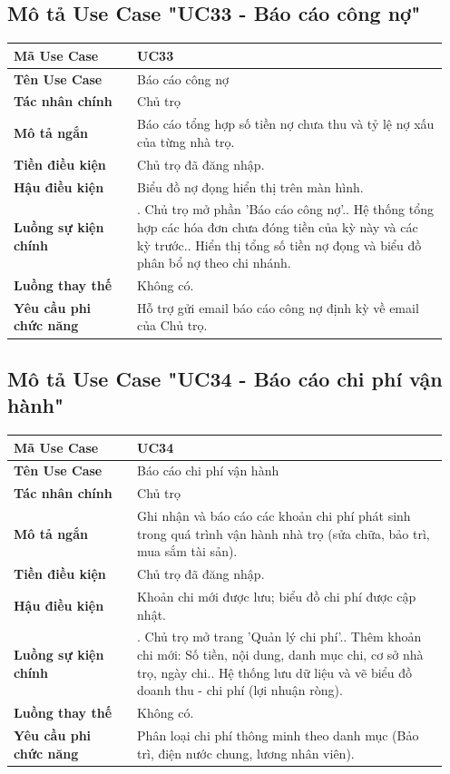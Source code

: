 \documentclass[a4paper,oneside]{report}
\begin{document}
\subsection{Mô tả Use Case "UC33 - Báo cáo công nợ"}

\begin{longtable}[]{@{}>{\RaggedRight\arraybackslash}p{0.27\linewidth}>{\RaggedRight\arraybackslash}p{0.68\linewidth}@{}}
\toprule
\textbf{Mã Use Case} & UC33\tabularnewline
\midrule
\endhead
\textbf{Tên Use Case} & Báo cáo công nợ\tabularnewline
\textbf{Tác nhân chính} & Chủ trọ\tabularnewline
\textbf{Mô tả ngắn} & Báo cáo tổng hợp số tiền nợ chưa thu và tỷ lệ nợ
xấu của từng nhà trọ.\tabularnewline
\textbf{Tiền điều kiện} & Chủ trọ đã đăng nhập.\tabularnewline
\textbf{Hậu điều kiện} & Biểu đồ nợ đọng hiển thị trên màn
hình.\tabularnewline
\textbf{Luồng sự kiện chính} & 1. Chủ trọ mở phần
'Báo cáo công nợ'.\newline 2. Hệ thống tổng hợp các hóa đơn chưa
đóng tiền của kỳ này và các kỳ trước.\newline 3. Hiển thị tổng số
tiền nợ đọng và biểu đồ phân bổ nợ theo chi nhánh.\tabularnewline
\textbf{Luồng thay thế} & Không có.\tabularnewline
\textbf{Yêu cầu phi chức năng} & Hỗ trợ gửi email báo cáo công nợ định
kỳ về email của Chủ trọ.\tabularnewline
\bottomrule
\end{longtable}

\subsection{Mô tả Use Case "UC34 - Báo cáo chi phí vận hành"}

\begin{longtable}[]{@{}>{\RaggedRight\arraybackslash}p{0.27\linewidth}>{\RaggedRight\arraybackslash}p{0.68\linewidth}@{}}
\toprule
\textbf{Mã Use Case} & UC34\tabularnewline
\midrule
\endhead
\textbf{Tên Use Case} & Báo cáo chi phí vận hành\tabularnewline
\textbf{Tác nhân chính} & Chủ trọ\tabularnewline
\textbf{Mô tả ngắn} & Ghi nhận và báo cáo các khoản chi phí phát sinh
trong quá trình vận hành nhà trọ (sửa chữa, bảo trì, mua sắm tài
sản).\tabularnewline
\textbf{Tiền điều kiện} & Chủ trọ đã đăng nhập.\tabularnewline
\textbf{Hậu điều kiện} & Khoản chi mới được lưu; biểu đồ chi phí được
cập nhật.\tabularnewline
\textbf{Luồng sự kiện chính} & 1. Chủ trọ mở trang
'Quản lý chi phí'.\newline 2. Thêm khoản chi mới: Số tiền, nội
dung, danh mục chi, cơ sở nhà trọ, ngày chi.\newline 3. Hệ thống
lưu dữ liệu và vẽ biểu đồ doanh thu - chi phí (lợi nhuận
ròng).\tabularnewline
\textbf{Luồng thay thế} & Không có.\tabularnewline
\textbf{Yêu cầu phi chức năng} & Phân loại chi phí thông minh theo danh
mục (Bảo trì, điện nước chung, lương nhân viên).\tabularnewline
\bottomrule
\end{longtable}
\end{document}
